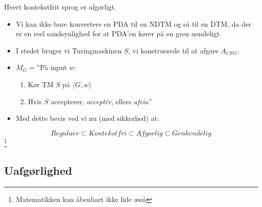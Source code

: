 \begin{frame}[allowframebreaks]
	\begin{theorem}
		Hvert kontekstfrit sprog er afgørligt.
	\end{theorem}
	\begin{itemize}
		\item Vi kan ikke bare konvertere en PDA til en NDTM og så til en DTM, da der er en reel sandsynlighed for at PDA'en kører på en gren uendeligt.
		\item I stedet bruger vi Turingmaskinen $S$, vi konstruerede til at afgøre $A_{CFG}$.
		\item $M_{G} = $''På input \(w\):
		      \begin{enumerate}
			      \item Kør TM $S$ på \(\langle G, w \rangle \)
			      \item Hvis $S$ accepterer, \textit{acceptér}, ellers \textit{afvis}.''
		      \end{enumerate}
	\end{itemize}
	\begin{itemize}
		\item Med dette bevis ved vi nu (med sikkerhed) at:
	\end{itemize}
	\begin{equation*}
		Regulaer \subset Kontekstfri \subset Afgorlig \subset Genkendelig
	\end{equation*}\footnote{Matematikken kan åbenbart ikke lide æøå}

\end{frame}

\subsection{Uafgørlighed}%
\label{subsec:uafgørlighed}

